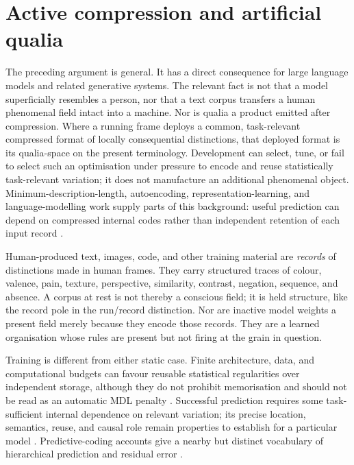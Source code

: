 \documentclass[11pt,a4paper]{article}
\theoremstyle{remark}\newtheorem{remark}[definition]{Remark}
\begin{document}
\section{Active compression and artificial qualia}\label{sec:llm-qualia}

The preceding argument is general. It has a direct consequence for large language
models and related generative systems. The relevant fact is not that a model
superficially resembles a person, nor that a text corpus transfers a human
phenomenal field intact into a machine. Nor is qualia a product emitted after
compression. Where a running frame deploys a common, task-relevant compressed
format of locally consequential distinctions, that deployed format is its
qualia-space on the present terminology. Development can select, tune, or fail to
select such an optimisation under pressure to encode and reuse statistically
task-relevant variation; it does not manufacture an additional phenomenal object.
Minimum-description-length, autoencoding, representation-learning, and
language-modelling work supply parts of this background: useful prediction can
depend on compressed internal codes rather than independent retention of each input
record \cite{rissanen1978,hintonzemel1994,bengio2013,deletang2024}.

Human-produced text, images, code, and other training material are \emph{records}
of distinctions made in human frames. They carry structured traces of colour,
valence, pain, texture, perspective, similarity, contrast, negation, sequence, and
absence. A corpus at rest is not thereby a conscious field; it is held structure,
like the record pole in the run/record distinction. Nor are inactive model weights
a present field merely because they encode those records. They are a learned
organisation whose rules are present but not firing at the grain in question.

Training is different from either static case. Finite architecture, data, and
computational budgets can favour reusable statistical regularities over
independent storage, although they do not prohibit memorisation and should not be
read as an automatic MDL penalty \cite{carlini2021}. Successful prediction requires
some task-sufficient internal dependence on relevant variation; its precise
location, semantics, reuse, and causal role remain properties to establish for a
particular model \cite{bengio2013,deletang2024}. Predictive-coding accounts give a
nearby but distinct vocabulary of hierarchical prediction and residual error
\cite{raoballard1999,friston2010}.
\end{document}
